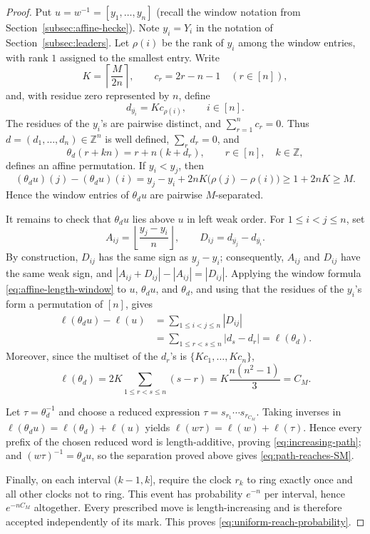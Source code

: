 \documentclass[11pt,a4paper]{amsart}
\theoremstyle{definition}
\theoremstyle{remark}
\numberwithin{equation}{section}
\newcommand{\Z}{\mathbb Z}
\newcommand{\floor}[1]{\left\lfloor #1\right\rfloor}
\newcommand{\ceil}[1]{\left\lceil #1\right\rceil}
\newcommand{\modn}[1]{\overline{#1}}
\begin{document}
	\begin{proof}
		Put $u=w^{-1}=[y_1,\ldots,y_n]$ (recall the window notation from Section~\ref{subsec:affine-hecke}). Note $y_i=Y_i$ in the notation of Section~\ref{subsec:leaders}. Let $\rho(i)$ be the rank of $y_i$
		among the window entries, with rank $1$ assigned to the smallest entry.  Write
		\[
		K=\ceil{\frac{M}{2n}},
		\qquad c_r=2r-n-1\quad(r\in[n]),
		\]
		and, with residue zero represented by $n$, define
		\[
		d_{\modn{y_i}}=Kc_{\rho(i)},\qquad i\in[n].
		\]
		The residues of the $y_i$'s are pairwise distinct, and $\sum_{r=1}^n c_r=0$.
		Thus $d=(d_1,\ldots,d_n)\in\Z^n$ is well defined, $\sum_r d_r=0$, and
		\[
		\theta_d(r+kn)=r+n(k+d_r),
		\qquad r\in[n],\quad k\in\Z,
		\]
		defines an affine permutation.  If $y_i<y_j$, then
		\[
		(\theta_du)(j)-(\theta_du)(i)
		=y_j-y_i+2nK\bigl(\rho(j)-\rho(i)\bigr)
		\ge 1+2nK\ge M.
		\]
		Hence the window entries of $\theta_du$ are pairwise $M$-separated.
		
		It remains to check that $\theta_du$ lies above $u$ in left weak order.  For
		$1\le i<j\le n$, set
		\[
		A_{ij}=\floor{\frac{y_j-y_i}{n}},
		\qquad
		D_{ij}=d_{\modn{y_j}}-d_{\modn{y_i}}.
		\]
		By construction, $D_{ij}$ has the same sign as $y_j-y_i$; consequently,
		$A_{ij}$ and $D_{ij}$ have the same weak sign, and
		$|A_{ij}+D_{ij}|-|A_{ij}|=|D_{ij}|$.  Applying the window formula
		\eqref{eq:affine-length-window} to $u$, $\theta_du$, and $\theta_d$, and
		using that the residues of the $y_i$'s form a permutation of $[n]$, gives
		\begin{align*}
			\ell(\theta_du)-\ell(u)
			&=\sum_{1\le i<j\le n}|D_{ij}|\\
			&=\sum_{1\le r<s\le n}|d_s-d_r|
			=\ell(\theta_d).
		\end{align*}
		Moreover, since the multiset of the $d_r$'s is
		$\{Kc_1,\ldots,Kc_n\}$,
		\[
		\ell(\theta_d)
		=2K\sum_{1\le r<s\le n}(s-r)
		=K\frac{n(n^2-1)}{3}=C_M.
		\]
		
		Let $\tau=\theta_d^{-1}$ and choose a reduced expression
		$\tau=s_{r_1}\cdots s_{r_{C_M}}$.  Taking inverses in
		$\ell(\theta_du)=\ell(\theta_d)+\ell(u)$ yields
		$\ell(w\tau)=\ell(w)+\ell(\tau)$.  Hence every prefix of the chosen reduced
		word is length-additive, proving \eqref{eq:increasing-path}; and
		$(w\tau)^{-1}=\theta_du$, so the separation proved above gives
		\eqref{eq:path-reaches-SM}.
		
		Finally, on each interval $(k-1,k]$, require the clock $r_k$ to ring exactly
		once and all other clocks not to ring.  This event has probability $e^{-n}$
		per interval, hence $e^{-nC_M}$ altogether.  Every prescribed move is
		length-increasing and is therefore accepted independently of its mark.  This
		proves \eqref{eq:uniform-reach-probability}.
	\end{proof}
	
\end{document}
